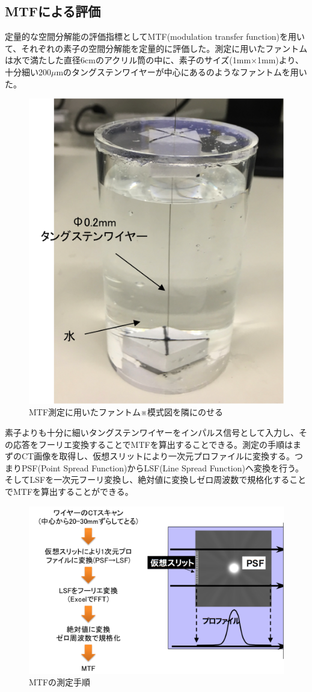 \subsection{MTFによる評価}
定量的な空間分解能の評価指標としてMTF(modulation transfer function)を用いて、それぞれの素子の空間分解能を定量的に評価した。測定に用いたファントムは水で満たした直径6cmのアクリル筒の中に、素子のサイズ(1mm$\times$1mm)より、十分細い200$\mu$mのタングステンワイヤーが中心にあるのようなファントムを用いた。

\begin{figure}[H]
 \begin{center}
 \includegraphics[bb=0.000000 0.000000 233.740677 279.336908,width=0.3\hsize]{image2/chapter5/MTF_phantom.png} 
 \end{center}
 \caption{MTF測定に用いたファントム※模式図を隣にのせる}
 \label{fig:MTF_phantom}
\end{figure}

素子よりも十分に細いタングステンワイヤーをインパルス信号として入力し、その応答をフーリエ変換することでMTFを算出することできる。測定の手順はまずのCT画像を取得し、仮想スリットにより一次元プロファイルに変換する。つまりPSF(Point Spread Function)からLSF(Line Spread Function)へ変換を行う。そしてLSFを一次元フーリ変換し、絶対値に変換しゼロ周波数で規格化することでMTFを算出することができる。

\begin{figure}[H]
 \begin{center}
 \includegraphics[bb=0.000000 0.000000 621.548619 408.446235,width=1\hsize]{image2/chapter5/MTF_method.png} 
 \end{center}
 \caption{MTFの測定手順}
 \label{fig:MTF_method}
\end{figure}

